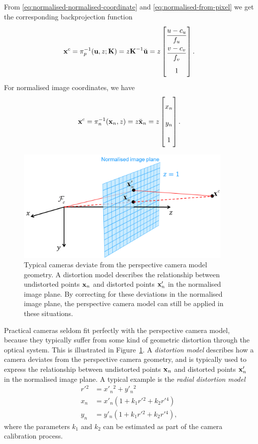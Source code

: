 From \eqref{eq:normalised-normalised-coordinate} and \eqref{eq:normalised-from-pixel} we get the corresponding backprojection function
\begin{equation}
  \vecx^c = \pi^{-1}_p(\vecu, z; \matK) = z \matK^{-1} \breve{\vecu} = z
  \renewcommand\arraystretch{2}
  \begin{bmatrix}
    \dfrac{u - c_u}{f_u}\\
    \dfrac{v - c_v}{f_v}\\
    1
  \end{bmatrix}.
\end{equation}
For normalised image coordinates, we have
\begin{equation} \label{eq:normalised-backprojection-function}
  \vecx^c = \pi^{-1}_n(\vecx_n, z) = z \breve{\vecx}_n = z
  \begin{bmatrix}
    x_n\\
    y_n\\
    1
  \end{bmatrix}.
\end{equation}

\begin{figure}[htb]
    \centering
    \includegraphics[height=5.5cm]{figures/radial-distortion.png}
    \caption{Typical cameras deviate from the perspective camera model geometry.
    A distortion model describes the relationship between undistorted points ${\boldsymbol{\mathbf{x}}}_n$ and distorted points ${\boldsymbol{\mathbf{x}}}'_n$ in the normalised image plane.
    By correcting for these deviations in the normalised image plane, the perspective camera model can still be applied in these situations.
    }
    \label{fig:radial-distortion}
\end{figure}
Practical cameras seldom fit perfectly with the perspective camera model, because they typically suffer from some kind of geometric distortion through the optical system.
This is illustrated in Figure~\ref{fig:radial-distortion}.
A \emph{distortion model} describes how a camera deviates from the perspective camera geometry, and is typically used to express the relationship between undistorted points ${\boldsymbol{\mathbf{x}}}_n$ and distorted points ${\boldsymbol{\mathbf{x}}}'_n$ in the normalised image plane.
A typical example is the \emph{radial distortion model}
\begin{align}
  r'{}^2 &= x'_n{}^2 + y'_n{}^2\\
  x_n &= x'_n (1 + k_1 r'{}^2 + k_2 r'{}^4)\\
  y_n &= y'_n (1 + k_1 r'{}^2 + k_2 r'{}^4),
\end{align}
where the parameters $k_1$ and $k_2$ can be estimated as part of the camera calibration process.

